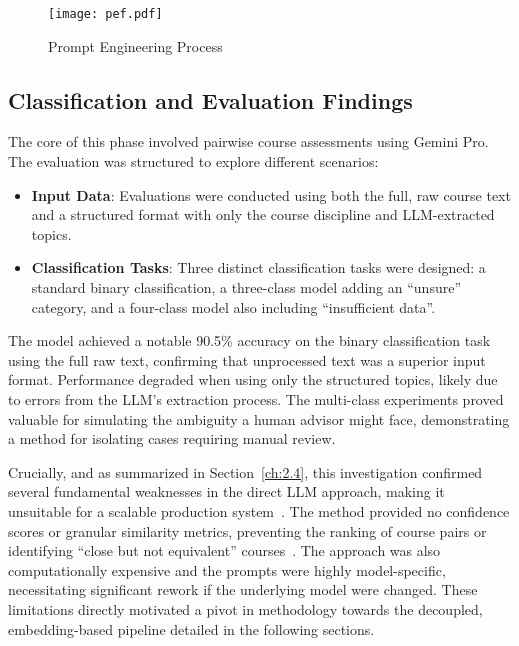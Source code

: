 \begin{figure}[tb]
    \captionsetup{skip=5pt}
    \centering
    \texttt{[image: pef.pdf]}
    \caption{Prompt Engineering Process}
    \label{fig:prompt_engineering_process}
\end{figure}

\subsection{Classification and Evaluation Findings}
The core of this phase involved pairwise course assessments using Gemini Pro. The evaluation was structured to explore different scenarios:
\begin{itemize}
    \item \textbf{Input Data}: Evaluations were conducted using both the full, raw course text and a structured format with only the course discipline and LLM-extracted topics.
    \item \textbf{Classification Tasks}: Three distinct classification tasks were designed: a standard binary classification, a three-class model adding an ``unsure'' category, and a four-class model also including ``insufficient data''.
\end{itemize}

The model achieved a notable 90.5\% accuracy on the binary classification task using the full raw text, confirming that unprocessed text was a superior input format. Performance degraded when using only the structured topics, likely due to errors from the LLM's extraction process. The multi-class experiments proved valuable for simulating the ambiguity a human advisor might face, demonstrating a method for isolating cases requiring manual review.

Crucially, and as summarized in Section~\ref{ch:2.4}, this investigation confirmed several fundamental weaknesses in the direct LLM approach, making it unsuitable for a scalable production system~\cite{pardos-articulation-2019, shiferaw2024}. The method provided no confidence scores or granular similarity metrics, preventing the ranking of course pairs or identifying ``close but not equivalent'' courses~\cite{reimers-2019-sentence-bert}. The approach was also computationally expensive and the prompts were highly model-specific, necessitating significant rework if the underlying model were changed. These limitations directly motivated a pivot in methodology towards the decoupled, embedding-based pipeline detailed in the following sections.

